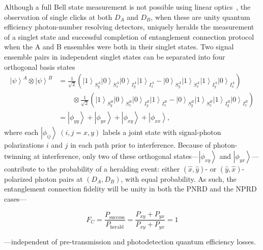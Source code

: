 \documentclass[aps,twocolumn,secnumarabic,amsmath,amssymb,pra,groupedaddress,
showpacs, showkeys]{revtex4-1}
\newcommand{\ket}[1]{\left|#1\right\rangle}
\newcommand{\pna}[1]{\left(#1\right)}
\newcommand{\eqn}[1]{
\begin{equation}
	#1
\end{equation}
}
\begin{document}
Although a full Bell state measurement is not possible using linear
optics~\cite{PhysRevA.59.3295}, the observation of single clicks at both $D_A$
and $D_B$, when these are unity quantum efficiency photon-number resolving
detectors, uniquely heralds the measurement of a singlet state and successful
completion of entanglement connection protocol when the A and B ensembles were
both in their singlet states. Two signal ensemble pairs in independent singlet
states can be separated into four orthogonal basis states
\begin{align}
\ket{\psi}^A \otimes \ket{\psi}^B & = \frac{1}{\sqrt{2}}\pna{\ket{1}_{S_y^A}\ket{0}_{S_x^A}\ket{0}_{I_y^A}\ket{1}_{I_x^A}-\ket{0}_{S_y^A}\ket{1}_{S_x^A}\ket{1}_{I_y^A}\ket{0}_{I_x^A}}\nonumber \\ & \qquad \otimes \frac{1}{\sqrt{2}}\pna{\ket{1}_{S_y^B}\ket{0}_{S_x^B}\ket{0}_{I_y^B}\ket{1}_{I_x^B}-\ket{0}_{S_y^B}\ket{1}_{S_x^B}\ket{1}_{I_y^B}\ket{0}_{I_x^B}} \nonumber \\
& = \ket{\phi_{yy}}+\ket{\phi_{yx}}+\ket{\phi_{xy}}+\ket{\phi_{xx}},
\end{align}
where each $\ket{\phi_{ij}}~\pna{i,j=x,y}$ labels a joint state with
signal-photon polarizations $i$ and $j$ in each path prior to interference.
Because of photon-twinning at interference, only two of these orthogonal
states---$\ket{\phi_{xy}}$ and $\ket{\phi_{yx}}$---contribute to the
probability of a heralding event: either $\pna{\hat{x},\hat{y}}$- or
$\pna{\hat{y},\hat{x}}$-polarized photon pairs at $\pna{D_A,D_B}$, with equal
probability.  As such, the entanglement connection fidelity will be unity in
both the PNRD and the NPRD cases---
\eqn{
F_C = \frac{P_{\textrm{success}}}{P_{\textrm{herald}}} = \frac{P_{xy}+P_{yx}}{P_{xy}+P_{yx}}=1
}
---independent of pre-transmission and photodetection quantum efficiency losses. 
\end{document}
